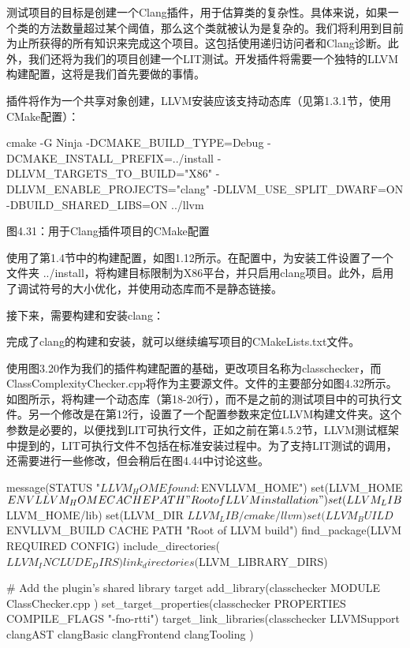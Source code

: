 测试项目的目标是创建一个Clang插件，用于估算类的复杂性。具体来说，如果一个类的方法数量超过某个阈值，那么这个类就被认为是复杂的。我们将利用到目前为止所获得的所有知识来完成这个项目。这包括使用递归访问者和Clang诊断。此外，我们还将为我们的项目创建一个LIT测试。开发插件将需要一个独特的LLVM构建配置，这将是我们首先要做的事情。


插件将作为一个共享对象创建，LLVM安装应该支持动态库（见第1.3.1节，使用CMake配置）：

\begin{shell}
cmake -G Ninja -DCMAKE_BUILD_TYPE=Debug -DCMAKE_INSTALL_PREFIX=../install -DLLVM_TARGETS_TO_BUILD="X86" -DLLVM_ENABLE_PROJECTS="clang" -DLLVM_USE_SPLIT_DWARF=ON -DBUILD_SHARED_LIBS=ON ../llvm
\end{shell}

\begin{center}
图4.31：用于Clang插件项目的CMake配置
\end{center}

使用了第1.4节中的构建配置，如图1.12所示。在配置中，为安装工件设置了一个文件夹 ../install，将构建目标限制为X86平台，并只启用clang项目。此外，启用了调试符号的大小优化，并使用动态库而不是静态链接。

接下来，需要构建和安装clang：


完成了clang的构建和安装，就可以继续编写项目的CMakeLists.txt文件。


使用图3.20作为我们的插件构建配置的基础，更改项目名称为classchecker，而ClassComplexityChecker.cpp将作为主要源文件。文件的主要部分如图4.32所示。如图所示，将构建一个动态库（第18-20行），而不是之前的测试项目中的可执行文件。另一个修改是在第12行，设置了一个配置参数来定位LLVM构建文件夹。这个参数是必要的，以便找到LIT可执行文件，正如之前在第4.5.2节，LLVM测试框架中提到的，LIT可执行文件不包括在标准安装过程中。为了支持LIT测试的调用，还需要进行一些修改，但会稍后在图4.44中讨论这些。

\begin{cmake}
message(STATUS "$LLVM_HOME found: $ENV{LLVM_HOME}")
set(LLVM_HOME $ENV{LLVM_HOME} CACHE PATH "Root of LLVM installation")
set(LLVM_LIB ${LLVM_HOME}/lib)
set(LLVM_DIR ${LLVM_LIB}/cmake/llvm)
set(LLVM_BUILD $ENV{LLVM_BUILD} CACHE PATH "Root of LLVM build")
find_package(LLVM REQUIRED CONFIG)
include_directories(${LLVM_INCLUDE_DIRS})
link_directories(${LLVM_LIBRARY_DIRS})

# Add the plugin's shared library target
add_library(classchecker MODULE
  ClassChecker.cpp
)
set_target_properties(classchecker PROPERTIES COMPILE_FLAGS "-fno-rtti")
target_link_libraries(classchecker
  LLVMSupport
  clangAST
  clangBasic
  clangFrontend
  clangTooling
)
\end{cmake}

